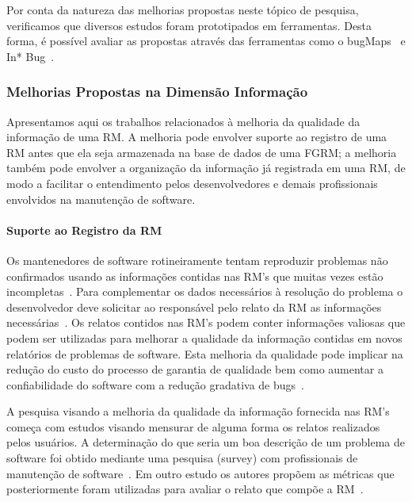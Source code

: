Por conta da natureza das melhorias propostas neste tópico de pesquisa,
verificamos que diversos estudos foram prototipados em ferramentas. Desta forma,
é possível avaliar as propostas através das ferramentas como o
bugMaps~\cite{hora2012bug} e In* Bug~\cite{dal2014bug}.

\subsubsection{Melhorias Propostas na Dimensão Informação}
\label{ssub:melhorias_dim_informacao}

Apresentamos aqui os trabalhos relacionados à melhoria da qualidade da
informação de uma RM.  A melhoria pode envolver suporte ao registro de uma RM
antes que ela seja armazenada na base de dados de uma FGRM\@; a melhoria também
pode envolver a organização da informação já registrada em uma RM, de modo a
facilitar o entendimento pelos desenvolvedores e demais profissionais envolvidos
na manutenção de software.

\paragraph{Suporte ao Registro da RM}

Os mantenedores de software rotineiramente tentam reproduzir problemas não
confirmados usando as informações contidas nas RM's que muitas vezes estão
incompletas~\cite{White:2015:GRR:2820282.2820291}. Para complementar os dados
necessários à resolução do problema o desenvolvedor deve solicitar ao
responsável pelo relato da RM as informações necessárias~\cite{5070993}. Os
relatos contidos nas RM's podem conter informações valiosas que podem ser
utilizadas para melhorar a qualidade da informação contidas em novos relatórios
de problemas de software. Esta melhoria da qualidade pode implicar na redução do
custo do processo de garantia de qualidade bem como aumentar a confiabilidade do
software com a redução gradativa de bugs~\cite{Tu:2014:MQI:2677832.2677844}.

A pesquisa visando a melhoria da qualidade da informação fornecida nas RM's
começa com estudos visando mensurar de alguma forma os relatos realizados pelos
usuários. A determinação do que seria um boa descrição de um problema de
software foi obtido mediante uma pesquisa (survey) com profissionais de
manutenção de software~\cite{Bettenburg2008a}. Em outro estudo os autores
propõem as métricas que posteriormente foram utilizadas para avaliar o relato
que compõe a RM~\cite{Tu:2014:MQI:2677832.2677844}.

